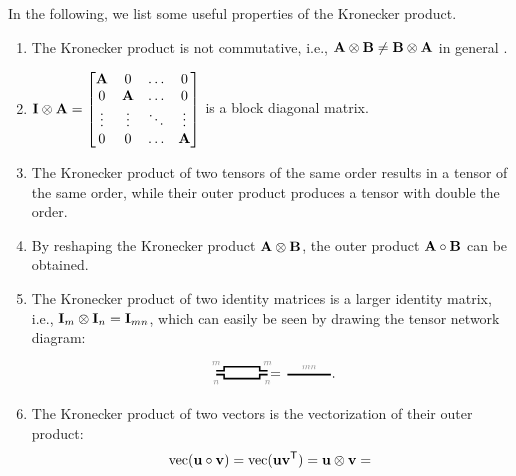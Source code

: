 \begin{remark}
In the following, we list some useful properties of the Kronecker product.
\begin{enumerate}
    \item The Kronecker product is not commutative, i.e., $\Ab\kron\Bb \neq \Bb\kron\Ab$ in general%
    . 
    \item
    $
    \Ib\kron\Ab = 
    \begin{bmatrix}
    \Ab & 0 & \dots & 0\\
    0 & \Ab & \dots & 0\\
    \vdots & \vdots & \ddots & \vdots\\
    0 & 0 & \dots & \Ab
    \end{bmatrix}
    $
    is a block diagonal matrix.
    \item The Kronecker product of two tensors of the same order results in a tensor of the same order, while their outer product produces a tensor with double the order.
    \item 
    By reshaping the Kronecker product $\Ab\kron\Bb$, the outer product $\Ab\outprod\Bb$ can be obtained.
 \item
The Kronecker product of two {identity matrices} is a larger identity matrix, i.e., $\Ib_m \kron \Ib_n = \Ib_{mn}$, which can easily be seen by drawing the tensor network diagram: 
$$
\begin{tikzpicture}[baseline=-0.5ex]
    \tikzset{tensor/.style = {minimum width = 3cm,minimum height = 0.6cm,shape = rounded rectangle,thick,draw=black,inner sep = 0pt}, edge/.style = {thick,line width=.4mm},every loop/.style={}}
    \def\x{0}
    \def\y{0.1}
    \draw[edge](\x-0.1,\y) node [above] {\scalebox{0.7}{\dimcolor{$m$}}}  -- (\x+0.1,\y) -- (\x+0.1,\y+0.1)--(\x+1,\y+0.1) -- (\x+1,\y)-- (\x+1.2,\y) node [above] {\scalebox{0.7}{\dimcolor{$m$}}};
    \draw[edge](\x-0.1,\y-0.1)  node [below] {\scalebox{0.7}{\dimcolor{$n$}}}  -- (\x+0.1,\y-0.1) -- (\x+0.1,\y-0.2)--(\x+1,\y-0.2) -- (\x+1,\y-0.1) --(\x+1.2,\y-0.1)  node [below] {\scalebox{0.7}{\dimcolor{$n$}}} ;
    \node[draw=none] at (\x+1.4,\y-0.1) {\scalebox{1}{\textcolor{black}{$=$}}};
    \draw[edge](\x+1.7,\y-0.1) -- (\x+2.8,\y-0.1) node [midway, above] {\scalebox{0.7}{\dimcolor{$mn$}}} ;
\end{tikzpicture}.
$$
     \item
     The Kronecker product of two vectors is the vectorization of their outer product: 
     $$\vectorize(\ub \outprod \vb) = \vectorize(\ub  \vb^\ts) =\ub \kron \vb =  \begin{tikzpicture}[baseline=-0.5ex]

\end{tikzpicture}$$
\end{enumerate}
\end{remark}
